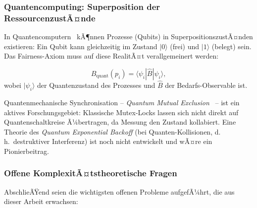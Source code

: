﻿\documentclass[a4paper,12pt]{article}
\theoremstyle{definition}
\begin{document}
\subsubsection{Quantencomputing: Superposition der Ressourcen\-zustÃ¤nde}

In Quantencomputern~\cite{nielsen2010quantum} kÃ¶nnen
Prozesse (Qubits) in SuperpositionszustÃ¤nden existieren:
Ein Qubit kann gleichzeitig im Zustand $|0\rangle$ (frei)
und $|1\rangle$ (belegt) sein. Das Fairness-Axiom muss auf
diese RealitÃ¤t verallgemeinert werden:

\[
  B_{\mathrm{quant}}(p_i)
  = \langle \psi_i | \hat{B} | \psi_i \rangle,
\]
wobei $|\psi_i\rangle$ der Quantenzustand des Prozesses
und $\hat{B}$ der Bedarfs-Observable ist.

Quantenmechanische Synchronisation -- \emph{Quantum Mutual
Exclusion}~\cite{mosca2007quantum} -- ist ein aktives
Forschungsgebiet: Klassische Mutex-Locks lassen sich nicht
direkt auf Quantenschaltkreise Ã¼bertragen, da Messung den
Zustand kollabiert. Eine Theorie des \emph{Quantum Exponential
Backoff} (bei Quanten-Kollisionen, d.\,h.\ destruktiver
Interferenz) ist noch nicht entwickelt und wÃ¤re ein
Pionierbeitrag.

\subsubsection{Offene KomplexitÃ¤tstheoretische Fragen}

AbschlieÃŸend seien die wichtigsten offenen Probleme
aufgefÃ¼hrt, die aus dieser Arbeit erwachsen:
\end{document}
